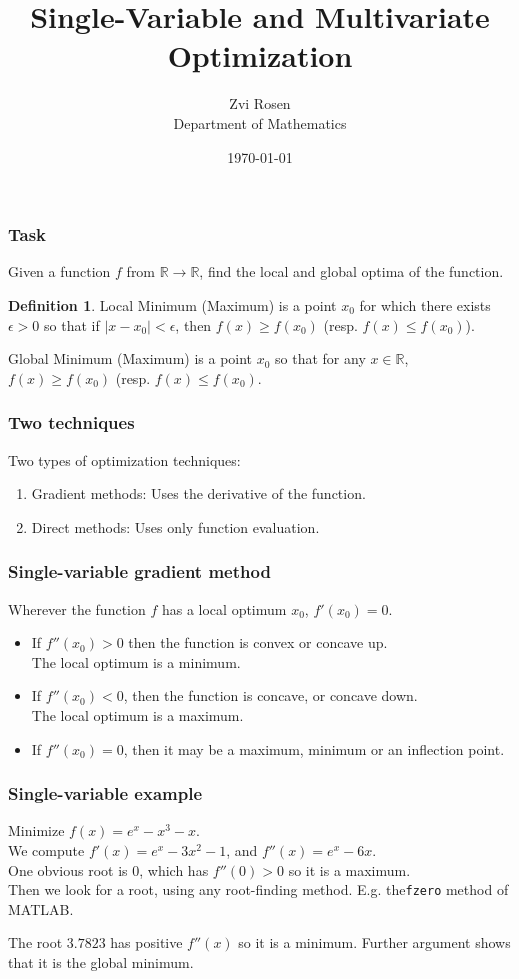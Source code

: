 \documentclass[12pt]{beamer}
\newcommand{\RR}{\ensuremath{\mathbb{R}}}
\theoremstyle{definition}
\newtheorem{defn}[thm]{Definition}
\begin{document}
\author[Z. Rosen]{Zvi Rosen \\ Department of Mathematics}

\date[\today]{\today}
\title[Optimization]{{\Large Single-Variable and Multivariate Optimization}}


\frame{\titlepage}

\begin{frame}
\frametitle{Task}
Given a function $f$ from $\RR \to \RR$, find the local
and global optima of the function.

\begin{defn}
Local Minimum (Maximum) is a point $x_0$ for which there exists $\epsilon > 0$
so that if $|x - x_0|<\epsilon$, then $f(x)\geq f(x_0)$ (resp. $f(x) \leq f(x_0)$).

Global Minimum (Maximum) is a point $x_0$ so that for any $x \in \RR$,
$f(x) \geq f(x_0)$ (resp. $f(x) \leq f(x_0)$.
\end{defn}
\end{frame}

\begin{frame}
\frametitle{Two techniques}
Two types of optimization techniques:
\begin{enumerate}
\item Gradient methods: Uses the derivative of 
the function.
\item Direct methods: Uses only function evaluation.
\end{enumerate}

\end{frame}

\begin{frame}
\frametitle{Single-variable gradient method}
Wherever the function $f$ has a local optimum $x_0$,
$f'(x_0) = 0$. \begin{itemize}
\item If $f''(x_0)>0$ then the function is convex or concave up. \\
The local optimum is a minimum.
\item If $f''(x_0)<0$, then the function is concave, or concave down. \\
The local optimum is a maximum.
\item If $f''(x_0) = 0$, then it may be a maximum, minimum or an inflection point. 
\end{itemize}
\end{frame}

\begin{frame}
\frametitle{Single-variable example}
Minimize $f(x) = e^x - x^3 - x$. \\

We compute $f'(x)= e^x - 3x^2 - 1$, and $f''(x) = e^x - 6x$. \\
One obvious root is $0$, which has $f''(0) > 0$ so it is a maximum. \\
Then we look for a root, using any root-finding method.
E.g. the{\tt fzero} method of MATLAB.

The root $3.7823$ has positive $f''(x)$ so it is a minimum. Further
argument shows that it is the global minimum.
\end{frame}
\end{document}
